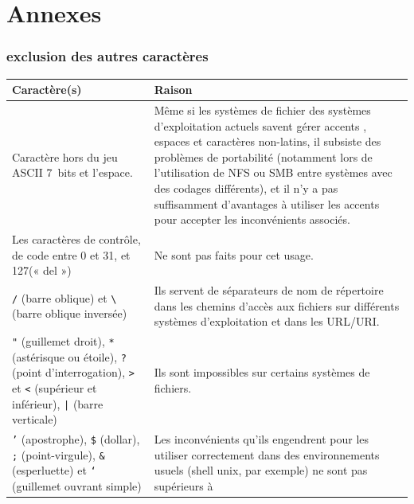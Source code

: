 
\part{Annexes}
\section{exclusion des autres caractères}
\label{sec:exclu}
\noindent

\begin{tabular}{p{}p{}}
  Caractère(s) & Raison\\ 
  \hline
  Caractère hors du jeu ASCII 7~bits 
  et l'espace.
  & Même si les
  systèmes de fichier des systèmes d’exploitation actuels savent gérer accents
  , espaces et caractères non-latins, il subsiste des problèmes de portabilité
  (notamment lors de l'utilisation de NFS ou SMB entre systèmes avec 
  des codages différents), et il n'y
  a pas suffisamment d'avantages à utiliser les accents pour accepter les
  inconvénients associés.\\
  \hline
  Les caractères de contrôle, de code entre 0 et
  31, et 127(« del ») & Ne sont pas faits pour cet usage. \\
  \hline
  \texttt{/} (barre oblique) et\newline
  \texttt{\textbackslash} (barre oblique inversée) &
   Ils servent de séparateurs de nom de répertoire dans les
  chemins d'accès aux fichiers sur différents systèmes d'exploitation et dans
  les URL/URI.\\
  \hline
  \texttt{"} (guillemet droit),\newline
  \texttt{*} (astérisque ou étoile),\newline
  \texttt{?} (point d'interrogation),\newline
  \texttt{>} et \texttt{<} (supérieur et inférieur),\newline
  \texttt{|} (barre verticale)
   & Ils sont impossibles sur certains systèmes de fichiers.\\
  \hline
  \texttt{'} (apostrophe),\newline
  \texttt{\$} (dollar),\newline
  \texttt{;} (point-virgule),\newline 
  \texttt{\&} (esperluette) et\newline
  \texttt{`} (guillemet ouvrant simple) & Les
  inconvénients qu'ils engendrent pour les utiliser correctement dans des
  environnements usuels (shell unix, par exemple) ne sont pas supérieurs à

\end{tabular}
